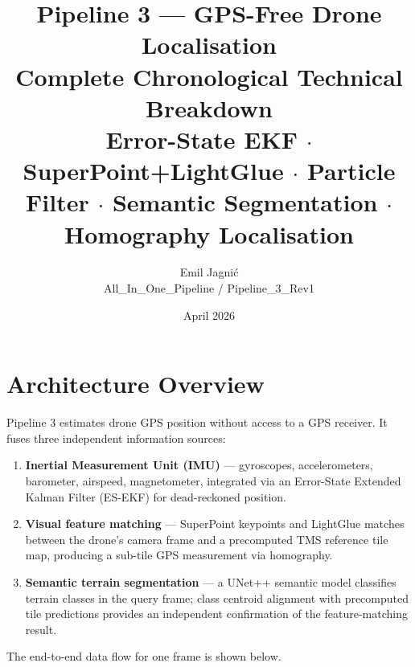 \documentclass[12pt,a4paper]{article}
\title{
    \Large\textbf{Pipeline 3 --- GPS-Free Drone Localisation}\\[0.5em]
    \large Complete Chronological Technical Breakdown\\[0.3em]
    \normalsize Error-State EKF $\cdot$ SuperPoint+LightGlue $\cdot$ Particle Filter $\cdot$
    Semantic Segmentation $\cdot$ Homography Localisation
}
\author{Emil Jagni\'c \\ \small All\_In\_One\_Pipeline / Pipeline\_3\_Rev1}
\date{April 2026}
\begin{document}
\maketitle
\tableofcontents
\newpage

\section{Architecture Overview}

Pipeline 3 estimates drone GPS position without access to a GPS receiver. It
fuses three independent information sources:

\begin{enumerate}
    \item \textbf{Inertial Measurement Unit (IMU)} --- gyroscopes, accelerometers,
          barometer, airspeed, magnetometer, integrated via an Error-State Extended
          Kalman Filter (ES-EKF) for dead-reckoned position.
    \item \textbf{Visual feature matching} --- SuperPoint keypoints and LightGlue
          matches between the drone's camera frame and a precomputed TMS reference
          tile map, producing a sub-tile GPS measurement via homography.
    \item \textbf{Semantic terrain segmentation} --- a UNet++ semantic model
          classifies terrain classes in the query frame; class centroid alignment
          with precomputed tile predictions provides an independent confirmation
          of the feature-matching result.
\end{enumerate}

The end-to-end data flow for one frame is shown below.
\end{document}
